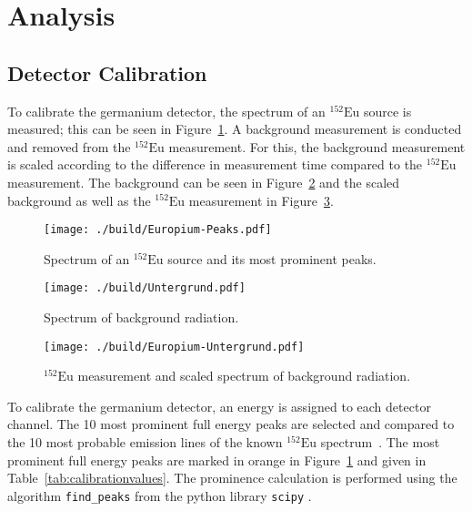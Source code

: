 \section{Analysis}
\subsection{Detector Calibration}
To calibrate the germanium detector, the spectrum of an $^{152}\text{Eu}$
source is measured; this can be seen in Figure~\ref{fig:spectrumeu}. A
background measurement is conducted and removed from the $^{152}\text{Eu}$
measurement. For this, the background measurement is scaled according to
the difference in measurement time compared to the $^{152}\text{Eu}$
measurement. The background can be seen in Figure~\ref{fig:background} and
the scaled background as well as the $^{152}\text{Eu}$ measurement in
Figure~\ref{fig:eubackground}.
\begin{figure}
	\centering
	\begin{adjustbox}{width=1.4\textwidth, center}
		\texttt{[image: ./build/Europium-Peaks.pdf]}
	\end{adjustbox}
	\caption{Spectrum of an $^{152}\text{Eu}$ source and its most prominent peaks.}
	\label{fig:spectrumeu}
\end{figure}
\begin{figure}
	\centering
	\begin{adjustbox}{width=1.4\textwidth, center}
		\texttt{[image: ./build/Untergrund.pdf]}
	\end{adjustbox}
	\caption{Spectrum of background radiation.}
	\label{fig:background}
\end{figure}
\begin{figure}
	\centering
	\begin{adjustbox}{width=1.4\textwidth, center}
		\texttt{[image: ./build/Europium-Untergrund.pdf]}
	\end{adjustbox}
	\caption{$^{152}\text{Eu}$ measurement and scaled spectrum of background radiation.}
	\label{fig:eubackground}
\end{figure}
\noindent
To calibrate the germanium detector, an energy is assigned to each detector channel.
The 10 most prominent full energy peaks are selected and compared to the 10 most probable emission
lines of the known $^{152}\text{Eu}$ spectrum~\cite{laraweb}. The most prominent full energy peaks are marked in
orange in Figure~\ref{fig:spectrumeu} and given in Table~\ref{tab:calibrationvalues}. The prominence
calculation is performed using the algorithm \texttt{find\_peaks} from the python library \texttt{scipy} \cite{scipy}.
